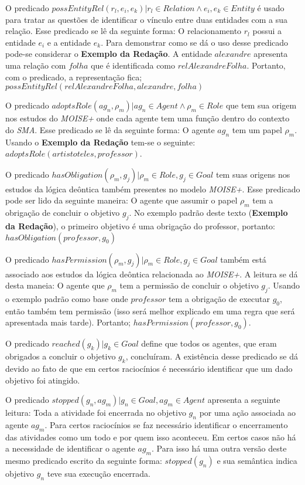 O predicado $possEntityRel(r_l,e_i,e_k) | r_l \in Relation \wedge  e_i, e_k \in Entity$ é usado para tratar as questões de identificar o vínculo entre duas entidades com a sua relação. Esse predicado se lê da seguinte forma: O relacionamento $r_l$ possui a entidade $e_i$ e a entidade $e_k$. Para demonstrar como se dá o uso desse predicado pode-se considerar o \textbf{Exemplo da Redação}. A entidade $alexandre$ apresenta uma relação com $folha$ que é identificada como $relAlexandreFolha$. Portanto, com o predicado, a representação fica; $possEntityRel(relAlexandreFolha,alexandre,folha)$

O predicado $adoptsRole(ag_n,\rho_m) | ag_n \in Agent \wedge \rho_m \in Role$ que tem sua origem nos estudos do \textit{MOISE+} onde cada agente tem uma função dentro do contexto do \textit{SMA}. Esse predicado se lê da seguinte forma: O agente $ag_n$ tem um papel $\rho_m$. Usando o \textbf{Exemplo da Redação} tem-se o seguinte: $adoptsRole(artistoteles,professor)$. 

O predicado $hasObligation(\rho_m,g_j) | \rho_m \in Role, g_j \in Goal $ tem suas origens nos estudos da lógica deôntica também presentes no modelo \textit{MOISE+}. Esse predicado pode ser lido da seguinte maneira: O agente que assumir o papel $\rho_m$ tem a obrigação de concluir o objetivo $g_j$. No exemplo padrão deste texto (\textbf{Exemplo da Redação}), o primeiro objetivo é uma obrigação do professor, portanto: $hasObligation(professor,g_0)$

O predicado $hasPermission(\rho_m, g_j) | \rho_m \in Role, g_j \in Goal $ também está associado aos estudos da lógica deôntica relacionada ao \textit{MOISE+}. A leitura se dá desta maneia: O agente que $\rho_m$ tem a permissão de concluir o objetivo $g_j$. Usando o exemplo padrão como base onde $professor$ tem a obrigação de executar $g_0$, então também tem permissão (isso será melhor explicado em uma regra que será apresentada mais tarde). Portanto; $hasPermission(professor,g_0)$.  

O predicado $reached(g_k) | g_k \in Goal $ define que todos os agentes, que eram obrigados a concluir o objetivo $g_k$, concluíram. A existência desse predicado se dá devido ao fato de que em certos raciocínios é necessário identificar que um dado objetivo foi atingido. 

O predicado $stopped(g_n, ag_m) | g_n \in Goal, ag_m \in Agent$ apresenta a seguinte leitura: Toda a atividade foi encerrada no objetivo $g_n$ por uma ação associada ao agente $ag_m$. Para certos raciocínios se faz necessário identificar o encerramento das atividades como um todo e por quem isso aconteceu. Em certos casos não há a necessidade de identificar o agente $ag_m$. Para isso há uma outra versão deste mesmo predicado escrito da seguinte forma: $stopped(g_n)$ e sua semântica indica objetivo $g_n$ teve sua execução encerrada.

